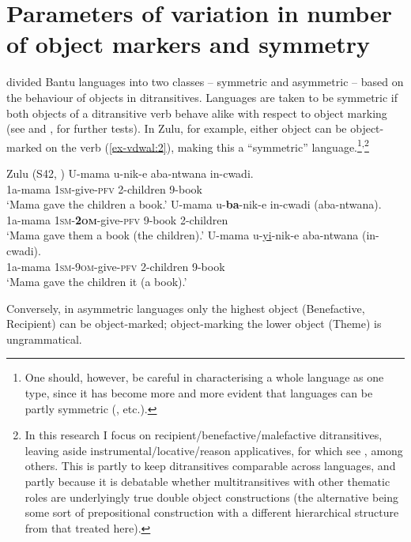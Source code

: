 \documentclass[output=paper
,modfonts
,nonflat]{langsci/langscibook}
\begin{document}
\section{Parameters of variation in number of object markers and symmetry} \label{sec-vdwal:2}

\citet{Bresnan_Moshi1990} divided Bantu languages into two classes -- symmetric and asymmetric -- based on the behaviour of objects in ditransitives. Languages are taken to be symmetric if both objects of a ditransitive verb behave alike with respect to object marking (see \citealt{Ngonyani1996} and \citealt{Buell2005}, for further tests). In Zulu, for example, either object can be object-marked on the verb (\ref{ex-vdwal:2}), making this a ``symmetric'' language.\footnote{One should, however, be careful in characterising a whole language as one type, since it has become more and more evident that languages can be partly symmetric (\citealt{Baker1988,Rugemalira1991,Alsina_Mchombo1993,Schadeberg1995,Simango1995,Ngonyani1996,Ngonyani_Githinji2006,Thwala2006,Riedel2009,Zeller_Ngoboka2006,Jerro2015,Jerro2016,Van_der_Wal2017a}, etc.).}\textsuperscript{,}\footnote{In this research I focus on recipient/benefactive/malefactive ditransitives, leaving aside instrumental/locative/reason applicatives, for which see \citet{Kimenyi1980,Baker1988,Alsina_Mchombo1993,Moshi1998,Ngonyani1998,Ngonyani_Githinji2006,Jerro2016}, among others. This is partly to keep ditransitives comparable across languages, and partly because it is debatable whether multitransitives with other thematic roles are underlyingly true double object constructions (the alternative being some sort of prepositional construction with a different hierarchical structure from that treated here).}


\begin{exe}	
\ex	Zulu (S42, \citealt[11]{Adams2010}) \label{ex-vdwal:2}
	\xlist
	\ex \label{ex-vdwal:2a}
		\gll U-mama u-nik-e aba-ntwana in-cwadi.\\  
	    1a-mama 1\textsc{sm}-give-\textsc{pfv} 2-children 9-book\\
		\glt `Mama gave the children a book.'
	\ex \label{ex-vdwal:2b}
		\gll U-mama u-\textbf{ba}-nik-e in-cwadi (aba-ntwana).\\
		1a-mama 1\textsc{sm}-\textbf{\textsc{2om}}-give-\textsc{pfv} 9-book 2-children\\
		\glt `Mama gave them a book (the children).'
	\ex \label{ex-vdwal:2c}
		\gll U-mama u-\uline{yi}-nik-e aba-ntwana (in-cwadi).\\ 
		1a-mama 1\textsc{sm}-\textsc{9om}-give-\textsc{pfv} 2-children 9-book\\
		\glt `Mama gave the children it (a book).'
	\endxlist
\end{exe}
Conversely, in asymmetric languages only the highest object (Benefactive, Recipient) can be object-marked; object-marking the lower object (Theme) is ungrammatical.
\end{document}
